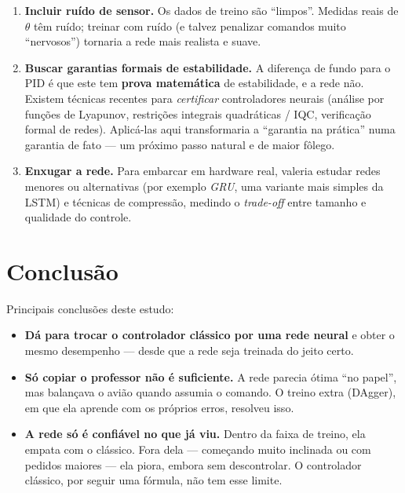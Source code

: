 \documentclass[11pt,a4paper]{article}
\begin{document}
\begin{enumerate}
  \item \textbf{Incluir ruído de sensor.} Os dados de treino são ``limpos''. Medidas
        reais de $\theta$ têm ruído; treinar com ruído (e talvez penalizar comandos muito
        ``nervosos'') tornaria a rede mais realista e suave.

  \item \textbf{Buscar garantias formais de estabilidade.} A diferença de fundo para o
        PID é que este tem \textbf{prova matemática} de estabilidade, e a rede não.
        Existem técnicas recentes para \emph{certificar} controladores neurais (análise
        por funções de Lyapunov, restrições integrais quadráticas / IQC, verificação
        formal de redes). Aplicá-las aqui transformaria a ``garantia na prática'' numa
        garantia de fato --- um próximo passo natural e de maior fôlego.

  \item \textbf{Enxugar a rede.} Para embarcar em hardware real, valeria estudar redes
        menores ou alternativas (por exemplo \emph{GRU}, uma variante mais simples da
        LSTM) e técnicas de compressão, medindo o \emph{trade-off} entre tamanho e
        qualidade do controle.
\end{enumerate}

\section{Conclusão}

Principais conclusões deste estudo:

\begin{itemize}
  \item \textbf{Dá para trocar o controlador clássico por uma rede neural} e obter o
        mesmo desempenho --- desde que a rede seja treinada do jeito certo.
  \item \textbf{Só copiar o professor não é suficiente.} A rede parecia ótima ``no
        papel'', mas balançava o avião quando assumia o comando. O treino extra
        (DAgger), em que ela aprende com os próprios erros, resolveu isso.
  \item \textbf{A rede só é confiável no que já viu.} Dentro da faixa de treino, ela
        empata com o clássico. Fora dela --- começando muito inclinada ou com pedidos
        maiores --- ela piora, embora sem descontrolar. O controlador clássico, por
        seguir uma fórmula, não tem esse limite.
\end{itemize}
\end{document}

